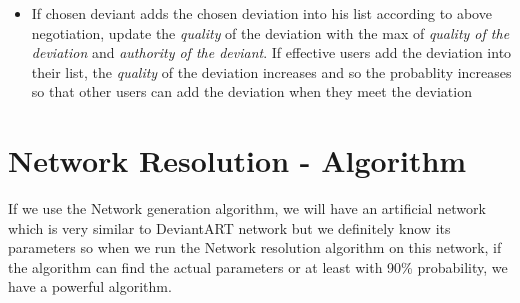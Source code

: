 \documentclass[12pt,a4paper]{report}
\begin{document}
\begin{itemize}
\begin{itemize}
\begin{itemize}
		\item If chosen deviant adds the chosen deviation into his list according to above negotiation, update the \emph{quality} of the deviation with the max of  \emph{quality of the deviation} and \emph{authority of the deviant}. If effective users add the deviation into their list, the \emph{quality} of the deviation increases and so the probablity increases so that other users can add the deviation when they meet the deviation 

		\end{itemize}

	\end{itemize}

\end{itemize}	

\chapter{Network Resolution - Algorithm}

	\hspace{0.6cm}If we use the Network generation algorithm, we will have an artificial network which is very similar to DeviantART network but we definitely know its parameters so when we run the Network resolution algorithm on this network, if the algorithm can find the actual parameters or at least with 90\% probability, we have a powerful algorithm. 
\end{document}
